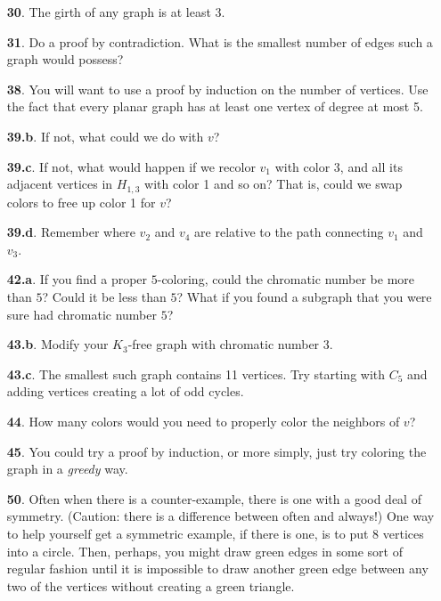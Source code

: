 \documentclass[10pt,]{book}
\theoremstyle{plain}
\theoremstyle{definition}
\theoremstyle{definition}
\theoremstyle{definition}
\numberwithin{equation}{chapter}
\begin{document}
\begin{itemize}[itemsep=1em]
\item[\textbf{30}.]\hypertarget{p-292}{}%
The girth of any graph is at least 3.%

\item[\textbf{31}.]\hypertarget{p-295}{}%
Do a proof by contradiction.  What is the smallest number of edges such a graph would possess?%

\item[\textbf{38}.]\hypertarget{p-350}{}%
You will want to use a proof by induction on the number of vertices.  Use the fact that every planar graph has at least one vertex of degree at most 5.%

\item[\textbf{39.b}.]\hypertarget{p-355}{}%
If not, what could we do with \(v\)?%

\item[\textbf{39.c}.]\hypertarget{p-357}{}%
If not, what would happen if we recolor \(v_1\) with color 3, and all its adjacent vertices in \(H_{1,3}\) with color 1 and so on?  That is, could we swap colors to free up color 1 for \(v\)?%

\item[\textbf{39.d}.]\hypertarget{p-359}{}%
Remember where \(v_2\) and \(v_4\) are relative to the path connecting \(v_1\) and \(v_3\).%

\item[\textbf{42.a}.]\hypertarget{p-373}{}%
If you find a proper \(5\)-coloring, could the chromatic number be more than \(5\)?  Could it be less than \(5\)?  What if you found a subgraph that you were sure had chromatic number \(5\)?%

\item[\textbf{43.b}.]\hypertarget{p-379}{}%
Modify your \(K_3\)-free graph with chromatic number 3.%

\item[\textbf{43.c}.]\hypertarget{p-381}{}%
The smallest such graph contains 11 vertices.  Try starting with \(C_5\) and adding vertices creating a lot of odd cycles.%

\item[\textbf{44}.]\hypertarget{p-387}{}%
How many colors would you need to properly color the neighbors of \(v\)?%

\item[\textbf{45}.]\hypertarget{p-390}{}%
You could try a proof by induction, or more simply, just try coloring the graph in a \emph{greedy} way.%

\item[\textbf{50}.]\hypertarget{p-414}{}%
Often when there is a counter-example, there is one with a good deal of symmetry. (Caution: there is a difference between often and always!) One way to help yourself get a symmetric example, if there is one, is to put 8 vertices into a circle. Then, perhaps, you might draw green edges in some sort of regular fashion until it is impossible to draw another green edge between any two of the vertices without creating a green triangle.%


\end{itemize}
\end{document}
